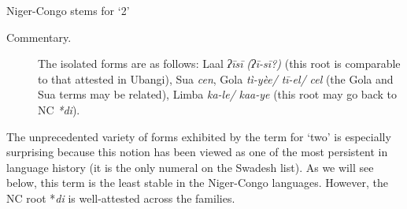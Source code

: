 \begin{table}
\caption{\label{tab:4:2}Niger-Congo stems for `2'}
\kppyramid



\end{table}
\begin{description}
\item[Commentary.] The isolated forms are as follows: Laal \textit{ʔ{\={i}}s{\={i}}} \textit{(ʔ{\={i}}-s{\={i}}?)} (this root is comparable to that attested in Ubangi), Sua \textit{cen}, Gola \textit{tì-yèe/} \textit{t{\={i}}-el/} \textit{cel}  (the Gola and Sua terms may be related), Limba \textit{ka-le/} \textit{kaa-ye} (this root may go back to NC \textit{*di}). 
\end{description}
The unprecedented variety of forms exhibited by the term for ‘two’ is especially surprising because this notion has been viewed as one of the most persistent in language history (it is the only numeral on the Swadesh list). As we will see below, this term is the least stable in the Niger-Congo languages. However, the NC root *\textit{di} is well-attested across the families.

   
